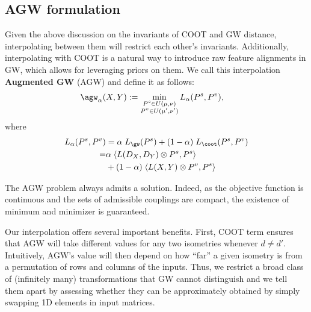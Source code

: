 \subsection{AGW formulation}
Given the above discussion on the invariants of COOT and GW distance,
interpolating between them will restrict each other's invariants. Additionally,
interpolating with COOT is a natural way to introduce raw feature alignments in GW,
which allows for leveraging priors on them.
We call this interpolation \textbf{Augmented GW} (AGW) and define it as follows:
\begin{align}
\label{eq:scootr}
\agw_{\alpha}(X, Y) &:=
\min_{\substack{P^s \in U(\mu,\nu) \\ P^v \in U(\mu',\nu')}} L_{\alpha}(P^s, P^v),
\end{align}
where
\begin{align*}
    L_{\alpha}(P^s, P^v) &= \alpha \; L_{\gw} (P^s) + (1-\alpha) \; L_{\coot} (P^s, P^v) \\
    =& \alpha \; \langle L(D_X,D_Y)\otimes P^s,P^s \rangle \\
    &+ (1-\alpha) \; \langle L(X,Y) \otimes P^v,P^s \rangle
\end{align*}

The AGW problem always admits a solution. Indeed, as the objective function is continuous
and the sets of admissible couplings are compact, the existence of minimum and minimizer
is guaranteed.

Our interpolation offers several important benefits. First, COOT term ensures that AGW
will take different values for any two isometries whenever $d \neq d'$. Intuitively,
AGW's value will then depend on how ``far'' a given isometry is from a permutation of rows
and columns of the inputs. Thus, we restrict a broad class of (infinitely many) transformations
that GW cannot distinguish and we tell them apart by assessing whether they
can be approximately obtained by simply swapping 1D elements in input matrices.


